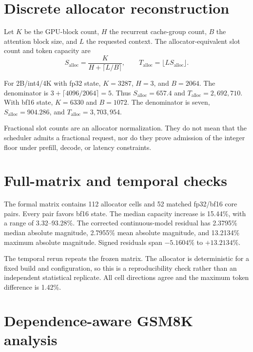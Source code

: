 \documentclass{article}
\begin{document}
\section{Discrete allocator reconstruction}
\label{app:discrete}

Let $K$ be the GPU-block count, $H$ the recurrent cache-group count, $B$ the
attention block size, and $L$ the requested context. The allocator-equivalent
slot count and token capacity are
\begin{equation}
S_{\mathrm{alloc}}=\frac{K}{H+\lceil L/B\rceil},\qquad
T_{\mathrm{alloc}}=\lfloor L S_{\mathrm{alloc}}\rfloor.
\end{equation}

For 2B/int4/4K with fp32 state, $K=3287$, $H=3$, and $B=2064$.
The denominator is $3+\lceil4096/2064\rceil=5$. Thus
$S_{\mathrm{alloc}}=657.4$ and $T_{\mathrm{alloc}}=2{,}692{,}710$.
With bf16 state, $K=6330$ and $B=1072$. The denominator is seven,
$S_{\mathrm{alloc}}=904.286$, and
$T_{\mathrm{alloc}}=3{,}703{,}954$.

Fractional slot counts are an allocator normalization. They do not mean that
the scheduler admits a fractional request, nor do they prove admission of the
integer floor under prefill, decode, or latency constraints.

\section{Full-matrix and temporal checks}
\label{app:matrix}

The formal matrix contains 112 allocator cells and 52 matched fp32/bf16 core
pairs. Every pair favors bf16 state. The median capacity increase is 15.44\%,
with a range of 3.32--93.28\%. The corrected continuous-model residual has
2.3795\% median absolute magnitude, 2.7955\% mean absolute magnitude, and
13.2134\% maximum absolute magnitude. Signed residuals span
$-5.1604\%$ to $+13.2134\%$.

The temporal rerun repeats the frozen matrix. The allocator is deterministic
for a fixed build and configuration, so this is a reproducibility check rather
than an independent statistical replicate. All cell directions agree and the
maximum token difference is 1.42\%.

\section{Dependence-aware GSM8K analysis}
\label{app:gsm8k}
\end{document}

